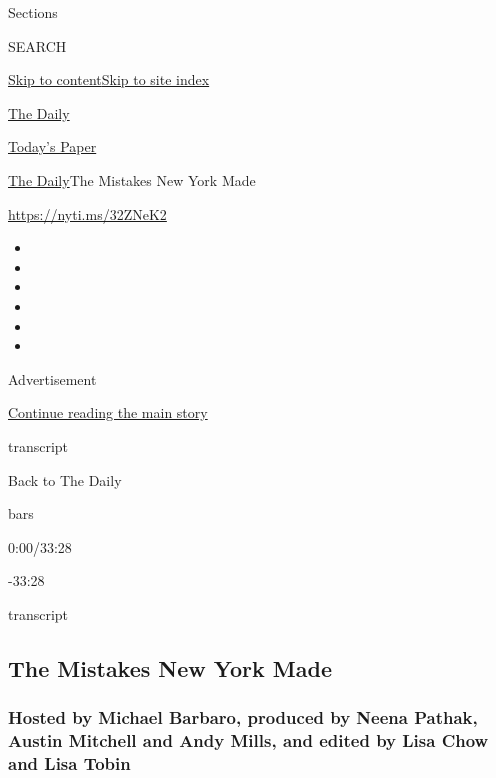 Sections

SEARCH

\protect\hyperlink{site-content}{Skip to
content}\protect\hyperlink{site-index}{Skip to site index}

\href{https://www.nytimes3xbfgragh.onion/podcasts/the-daily}{The Daily}

\href{https://myaccount.nytimes3xbfgragh.onion/auth/login?response_type=cookie\&client_id=vi}{}

\href{https://www.nytimes3xbfgragh.onion/section/todayspaper}{Today's
Paper}

\href{/podcasts/the-daily}{The Daily}\textbar{}The Mistakes New York
Made

\url{https://nyti.ms/32ZNeK2}

\begin{itemize}
\item
\item
\item
\item
\item
\item
\end{itemize}

Advertisement

\protect\hyperlink{after-top}{Continue reading the main story}

transcript

Back to The Daily

bars

0:00/33:28

-33:28

transcript

\hypertarget{the-mistakes-new-york-made}{%
\subsection{The Mistakes New York
Made}\label{the-mistakes-new-york-made}}

\hypertarget{hosted-by-michael-barbaro-produced-by-neena-pathak-austin-mitchell-and-andy-mills-and-edited-by-lisa-chow-and-lisa-tobin}{%
\subsubsection{Hosted by Michael Barbaro, produced by Neena Pathak,
Austin Mitchell and Andy Mills, and edited by Lisa Chow and Lisa
Tobin}\label{hosted-by-michael-barbaro-produced-by-neena-pathak-austin-mitchell-and-andy-mills-and-edited-by-lisa-chow-and-lisa-tobin}}

